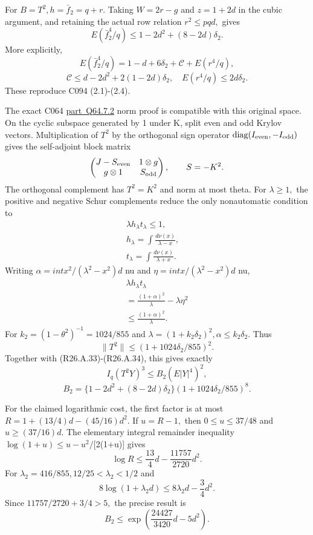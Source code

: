 For \(B=T^2,\allowbreak  h=\bar f_2=q+r.\) Taking \(W=2r-g\) and \(z=1+2d\) in the cubic argument,
and retaining the actual row relation \(r^2\le pqd,\allowbreak \) gives
\[
E(\bar f_2^4/q)\le1-2d^2+(8-2d)\delta_2.                 \tag{R26.A.34}
\]
More explicitly,
\[
E(\bar f_2^4/q)=1-d+6\delta_2+\mathcal C+E(r^4/q),
\]
\[
\mathcal C\le d-2d^2+2(1-2d)\delta_2,\quad
E(r^4/q)\le2d\delta_2.
\]
These reproduce C094 (2.1)-(2.4).

The exact C064 \mbox{\hyperref[part:Q64.7.2]{part Q64.7.2}} norm proof is compatible with this original
space. On the cyclic subspace generated by 1 under K, split even and odd
Krylov vectors. Multiplication of \(T^2\) by the orthogonal sign operator
\(\operatorname{diag}(I_{\rm even},\allowbreak -I_{\rm odd})\) gives the self-adjoint block matrix
\[
\begin{pmatrix}
J-S_{\rm even}&1\otimes g\\
g\otimes1&S_{\rm odd}
\end{pmatrix},\qquad S=-K^2.
\]
The orthogonal complement has \(T^2=K^2\) and norm at most theta.
For \(\lambda\ge 1,\allowbreak \) the positive and negative Schur complements reduce the
only nonautomatic condition to
\[
\begin{gathered}
\lambda h_\lambda t_\lambda\le1,\quad\\
h_\lambda=\int\frac{d\nu(x)}{\lambda-x},\quad\\
t_\lambda=\int\frac{d\nu(x)}{\lambda+x}.
\end{gathered}
\]
Writing \(\alpha=int x^2/(\lambda^2-x^2)d\) nu and \(\eta=int x/(\lambda^2-x^2)d\) nu,
\[
\begin{gathered}
\lambda h_\lambda t_\lambda\\
=\frac{(1+\alpha)^2}{\lambda}-\lambda\eta^2\\
\le\frac{(1+\alpha)^2}{\lambda}.
\end{gathered}
\]
For \(k_2=(1-\theta^2)^{-1}=1024/855\) and
\(\lambda=(1+k_2\delta_2)^2,\allowbreak  \alpha\le k_2\delta_2.\) Thus
\[
\|T^2\|\le(1+1024\delta_2/855)^2.
\]
Together with (R26.A.33)-(R26.A.34), this gives exactly
\[
I_q(T^2Y)^3\le B_2(E|Y|^4)^2,
\]
\[
B_2=\{1-2d^2+(8-2d)\delta_2\}(1+1024\delta_2/855)^8.      \tag{R26.A.35}
\]

For the claimed logarithmic cost, the first factor is at most
\(R=1+(13/4)d-(45/16)d^2.\) If \(u=R-1,\allowbreak \) then
\(0\le u\le 37/48\) and \(u\ge (37/16)d.\) The elementary integral remainder inequality
\(\log(1+u)\le u-u^2/\)[2(1+u)] gives
\[
\log R\le\frac{13}{4}d-\frac{11757}{2720}d^2.
\]
For \(\lambda_2=416/855,\allowbreak  12/25<\lambda_2<1/2\) and
\[
8\log(1+\lambda_2d)
\le8\lambda_2d-\frac34d^2.
\]
Since \(11757/2720+3/4>5,\allowbreak \) the precise result is
\[
B_2\le\exp\left(\frac{24427}{3420}d-5d^2\right). \tag{R26.A.36}
\]

